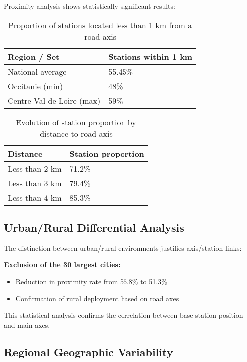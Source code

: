 \documentclass[12pt,a4paper]{report}
\begin{document}
Proximity analysis shows statistically significant results:

\begin{table}[h]
    \centering
    \begin{tabularx}{0.7\textwidth}{l X}
        \hline
        \textbf{Region / Set} & \textbf{Stations within 1 km} \\
        \hline
        National average & 55.45\% \\
        Occitanie (min)   & 48\% \\
        Centre-Val de Loire (max) & 59\% \\
        \hline
    \end{tabularx}
    \caption{Proportion of stations located less than 1 km from a road axis}
    \label{tab:moins1km}
\end{table}

\begin{table}[h]
    \centering
    \begin{tabularx}{0.7\textwidth}{l X}
        \hline
        \textbf{Distance} & \textbf{Station proportion} \\
        \hline
        Less than 2 km & 71.2\% \\
        Less than 3 km & 79.4\% \\
        Less than 4 km & 85.3\% \\
        \hline
    \end{tabularx}
    \caption{Evolution of station proportion by distance to road axis}
    \label{tab:evolution_distance}
\end{table}

\subsection{Urban/Rural Differential Analysis}

The distinction between urban/rural environments justifies axis/station links:

\textbf{Exclusion of the 30 largest cities:}
\begin{itemize}
    \item Reduction in proximity rate from 56.8\% to 51.3\%
    \item Confirmation of rural deployment based on road axes
\end{itemize}

This statistical analysis confirms the correlation between base station position and main axes.

\subsection{Regional Geographic Variability}
\end{document}
